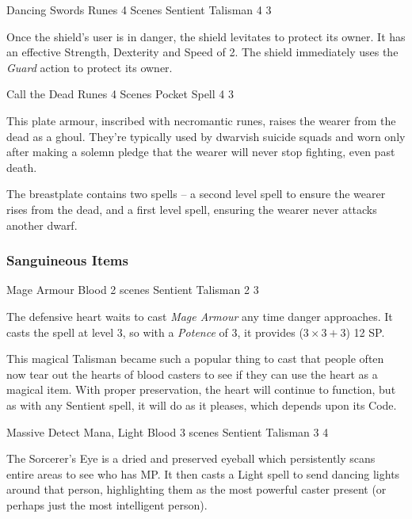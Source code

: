 \begin{multicols}{2}
	{Dancing Swords}%
	{Runes}%
	{4 Scenes}%
	{Sentient Talisman}%
	{4}%
	{3}%

Once the shield's user is in danger, the shield levitates to protect its owner.
It has an effective Strength, Dexterity and Speed of 2.
The shield immediately uses the \textit{Guard} action to protect its owner.

	{Call the Dead}%
	{Runes}%
	{4 Scenes}%
	{Pocket Spell}%
	{4}%
	{3}%

\label{eternalwarriorarmour}

This plate armour, inscribed with necromantic runes, raises the wearer from the dead as a ghoul.
They're typically used by dwarvish suicide squads and worn only after making a solemn pledge that the wearer will never stop fighting, even past death.

The breastplate contains two spells -- a second level spell to ensure the wearer rises from the dead, and a first level spell, ensuring the wearer never attacks another dwarf.

\subsubsection{Sanguineous Items}

	{Mage Armour}%
	{Blood}%
	{2 scenes}%
	{Sentient Talisman}%
	{2}%
	{3}%

The defensive heart waits to cast \textit{Mage Armour} any time danger approaches.
It casts the spell at level 3, so with a \textit{Potence} of 3, it provides ($3\times3+3$) 12 SP.

This magical Talisman became such a popular thing to cast that people often now tear out the hearts of blood casters to see if they can use the heart as a magical item.
With proper preservation, the heart will continue to function, but as with any Sentient spell, it will do as it pleases, which depends upon its Code.

	{Massive Detect Mana, Light}%
	{Blood}%
	{3 scenes}%
	{Sentient Talisman}%
	{3}%
	{4}%

The Sorcerer's Eye is a dried and preserved eyeball which persistently scans entire areas to see who has MP.
It then casts a Light spell to send dancing lights around that person, highlighting them as the most powerful caster present (or perhaps just the most intelligent person).


\end{multicols}
